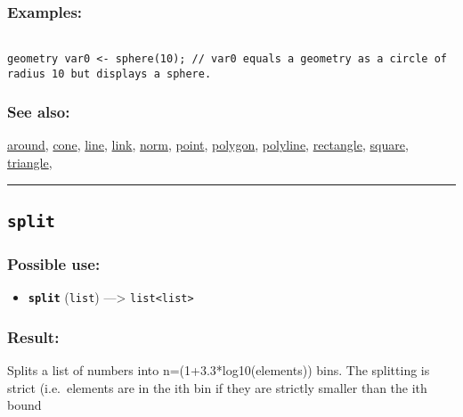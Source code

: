 \documentclass[]{book}
\providecommand{\tightlist}{%
  \setlength{\itemsep}{0pt}\setlength{\parskip}{0pt}}
\theoremstyle{definition}
\theoremstyle{definition}
\theoremstyle{definition}
\theoremstyle{remark}
\begin{document}
\subsubsection{Examples:}\label{examples-342}

\begin{verbatim}
 
geometry var0 <- sphere(10); // var0 equals a geometry as a circle of radius 10 but displays a sphere.
\end{verbatim}

\subsubsection{See also:}\label{see-also-191}

\href{OperatorsAA\#around}{around}, \href{OperatorsBC\#cone}{cone},
\href{OperatorsIM\#line}{line}, \href{OperatorsIM\#link}{link},
\href{OperatorsNR\#norm}{norm}, \href{OperatorsNR\#point}{point},
\href{OperatorsNR\#polygon}{polygon},
\href{OperatorsNR\#polyline}{polyline},
\href{OperatorsNR\#rectangle}{rectangle},
\href{OperatorsSZ\#square}{square},
\href{OperatorsSZ\#triangle}{triangle},

\begin{center}\rule{0.5\linewidth}{\linethickness}\end{center}

\subsection{\texorpdfstring{\texttt{split}}{split}}\label{split}

\subsubsection{Possible use:}\label{possible-use-491}

\begin{itemize}
\tightlist
\item
  \textbf{\texttt{split}} (\texttt{list}) ---\textgreater{}
  \texttt{list\textless{}list\textgreater{}}
\end{itemize}

\subsubsection{Result:}\label{result-475}

Splits a list of numbers into n=(1+3.3*log10(elements)) bins. The
splitting is strict (i.e.~elements are in the ith bin if they are
strictly smaller than the ith bound
\end{document}
